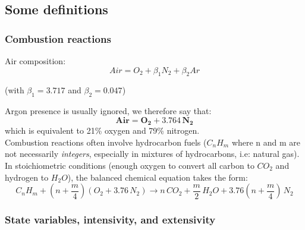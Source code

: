 \documentclass[a4paper,11pt]{article}
\begin{document}
\subsection{Some definitions}
\subsubsection{Combustion reactions}
Air composition:
\[Air = O_2 + \beta_1N_2 + \beta_2Ar\]
\begin{center}
(with $\beta_1 = 3.717$ and $\beta_2 = 0.047$)\\    
\end{center}
\noindent
Argon presence is usually ignored, we therefore say that:
\[\mathbf{Air = O_2 + 3.764\,N_2}\]
which is equivalent to 21\% oxygen and 79\% nitrogen.\\
Combustion reactions often involve hydrocarbon fuels ($C_nH_m$ where n and m are not necessarily \emph{integers}, especially in mixtures of hydrocarbons, i.e: natural gas). In stoichiometric conditions (enough oxygen to convert all carbon to $CO_2$ and hydrogen to $H_2O$), the balanced chemical equation takes the form:
\[C_nH_m + (n+ \frac{m}{4})(O_2+3.76\,N_2) \rightarrow n\,CO_2 + \frac{m}{2}\,H_2O+3.76(n+\frac{m}{4})\,N_2\]

\subsubsection{State variables, intensivity, and extensivity}
\end{document}
